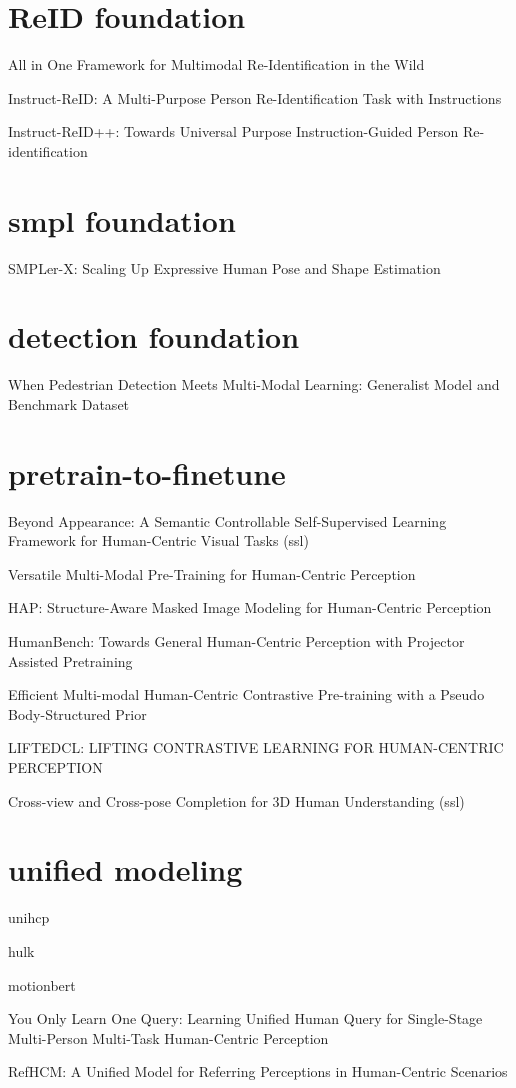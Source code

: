 \section{ReID foundation}
All in One Framework for Multimodal Re-Identification in the Wild

Instruct-ReID: A Multi-Purpose Person Re-Identification Task with Instructions

Instruct-ReID++: Towards Universal Purpose Instruction-Guided Person Re-identification

\section{smpl foundation}
SMPLer-X: Scaling Up Expressive Human Pose and Shape Estimation

\section{detection foundation}
When Pedestrian Detection Meets Multi-Modal Learning: Generalist Model and Benchmark Dataset

\section{pretrain-to-finetune}
Beyond Appearance: A Semantic Controllable Self-Supervised Learning Framework for Human-Centric Visual Tasks (ssl)

Versatile Multi-Modal Pre-Training for Human-Centric Perception

HAP: Structure-Aware Masked Image Modeling for Human-Centric Perception

HumanBench: Towards General Human-Centric Perception with Projector Assisted Pretraining

Efficient Multi-modal Human-Centric Contrastive Pre-training with a Pseudo Body-Structured Prior

LIFTEDCL: LIFTING CONTRASTIVE LEARNING FOR HUMAN-CENTRIC PERCEPTION

Cross-view and Cross-pose Completion for 3D Human Understanding (ssl)

\section{unified modeling}
unihcp

hulk

motionbert

You Only Learn One Query: Learning Unified Human Query for Single-Stage Multi-Person Multi-Task Human-Centric Perception

RefHCM: A Unified Model for Referring Perceptions in Human-Centric Scenarios

